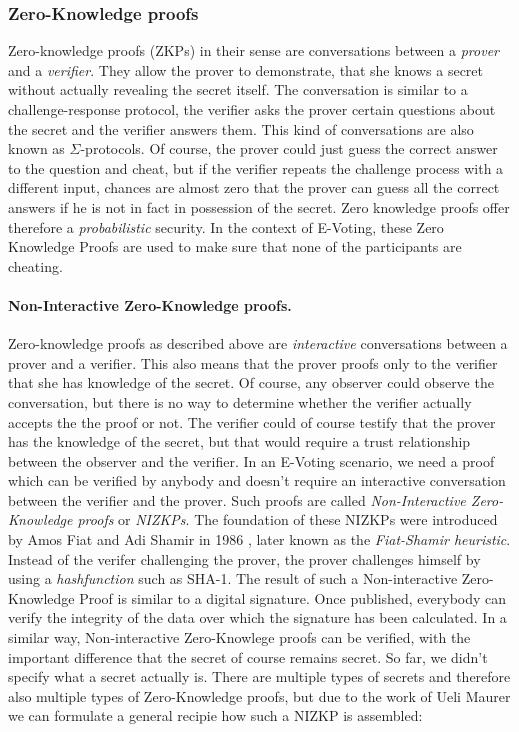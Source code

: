 \documentclass[numbers=noenddot, abstract=on]{scrreprt}
\begin{document}
\subsubsection{Zero-Knowledge proofs}
\label{sec:zeroknowledgeproofs}
Zero-knowledge proofs (ZKPs) in their sense are conversations between a
\textit{prover} and a \textit{verifier}. They allow the prover to demonstrate,
that she knows a secret without actually revealing the secret itself. The
conversation is similar to a challenge-response protocol, the verifier asks the
prover certain questions about the secret and the verifier answers them. This
kind of conversations are also known as $\Sigma$-protocols. Of course, the
prover could just guess the correct answer to the question and cheat, but if the
verifier repeats the challenge process with a different input, chances are
almost zero that the prover can guess all the correct answers if he is not in
fact in possession of the secret. Zero knowledge proofs offer therefore a
\textit{probabilistic} security. In the context of E-Voting, these Zero
Knowledge Proofs are used to make sure that none of the participants are
cheating.

\paragraph{Non-Interactive Zero-Knowledge proofs.}
Zero-knowledge proofs as described above are \textit{interactive} conversations
between a prover and a verifier. This also means that the prover proofs only to
the verifier that she has knowledge of the secret. Of course, any observer could
observe the conversation, but there is no way to determine whether the verifier
actually accepts the the proof or not. The verifier could of course testify that
the prover has the knowledge of the secret, but that would require a trust
relationship between the observer and the verifier. In an E-Voting scenario, we
need a proof which can be verified by anybody and doesn't require an interactive
conversation between the verifier and the prover. Such proofs are called
\textit{Non-Interactive Zero-Knowledge proofs} or \textit{NIZKPs}. The
foundation of these NIZKPs were introduced by Amos Fiat and Adi Shamir in 1986
\cite{FS87}, later known as the \textit{Fiat-Shamir heuristic}. Instead of the
verifer challenging the prover, the prover challenges himself by using a
\textit{hashfunction} such as SHA-1. The result of such a Non-interactive
Zero-Knowledge Proof is similar to a digital signature. Once published,
everybody can verify the integrity of the data over which the signature has been
calculated. In a similar way, Non-interactive Zero-Knowlege proofs can be
verified, with the important difference that the secret of course remains
secret. So far, we didn't specify what a secret actually is. There are multiple
types of secrets and therefore also multiple types of Zero-Knowledge proofs, but
due to the work of Ueli Maurer \cite{Maurer09} we can formulate a general
recipie how such a NIZKP is assembled:
\end{document}
